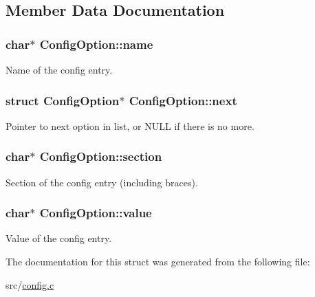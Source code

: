 \subsection{\-Member \-Data \-Documentation}
\hypertarget{structConfigOption_a8dc6a5e10d3f048a19843a787614d2a4}{
\subsubsection[{name}]{\setlength{\rightskip}{0pt plus 5cm}char$\ast$ {\bf \-Config\-Option\-::name}}}\label{structConfigOption_a8dc6a5e10d3f048a19843a787614d2a4}
\-Name of the config entry. \hypertarget{structConfigOption_a15b925b102759c36be6462f899a7ae83}{
\subsubsection[{next}]{\setlength{\rightskip}{0pt plus 5cm}struct {\bf \-Config\-Option}$\ast$ {\bf \-Config\-Option\-::next}}}\label{structConfigOption_a15b925b102759c36be6462f899a7ae83}
\-Pointer to next option in list, or \-N\-U\-L\-L if there is no more. \hypertarget{structConfigOption_acca2c375d93b980a861538ceeed618b4}{
\subsubsection[{section}]{\setlength{\rightskip}{0pt plus 5cm}char$\ast$ {\bf \-Config\-Option\-::section}}}\label{structConfigOption_acca2c375d93b980a861538ceeed618b4}
\-Section of the config entry (including braces). \hypertarget{structConfigOption_a7744464324b11814fb995fd01d69a595}{
\subsubsection[{value}]{\setlength{\rightskip}{0pt plus 5cm}char$\ast$ {\bf \-Config\-Option\-::value}}}\label{structConfigOption_a7744464324b11814fb995fd01d69a595}
\-Value of the config entry. 

\-The documentation for this struct was generated from the following file\-:\begin{DoxyCompactItemize}
\item 
src/\hyperlink{config_8c}{config.\-c}\end{DoxyCompactItemize}
